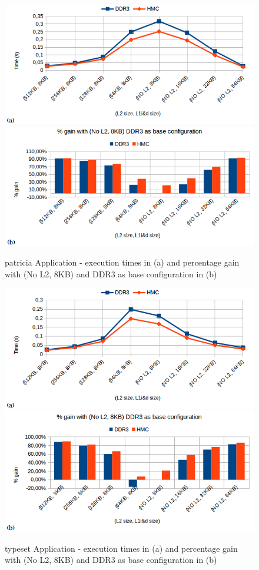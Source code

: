 \documentclass{sig-alternate-05-2015}
\begin{document}
\begin{figure}
	\centering
	\includegraphics[scale=0.38]{images/graficos/patricia_}\includegraphics[scale=0.38]{images/graficos/patricia_perc_}
	
	\caption{\label{fig:patricia-Application}patricia Application - execution
		times in (a) and percentage gain with (No L2, 8KB) and DDR3 as base configuration
		in (b)}
\end{figure}
\begin{figure}
	\centering
\includegraphics[scale=0.38]{images/graficos/typeset_}\includegraphics[scale=0.38]{images/graficos/typeset_perc_}\caption{\label{fig:typeset-Application}typeset Application - execution times
in (a) and percentage gain with (No L2, 8KB) and DDR3 as base configuration
in (b)}
\end{figure}
\end{document}
